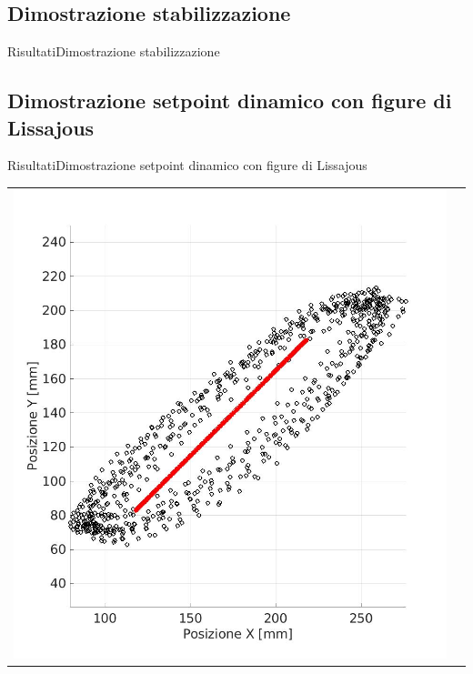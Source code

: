 \documentclass[10pt,aspectratio=169
	]{beamer}
\begin{document}
	\subsection{Dimostrazione stabilizzazione}
	\begin{frame}{Risultati}{Dimostrazione stabilizzazione}
	\centering{}

	\end{frame}
	
	\subsection{Dimostrazione setpoint dinamico con figure di Lissajous}
	\begin{frame}{Risultati}{Dimostrazione setpoint dinamico con figure di Lissajous}
	\centering
	\begin{tabular}{cc}
	\hspace{0cm}
  \includegraphics[height=0.4\textheight]{images/rc.jpg}
  &
  \hspace{1cm}

\end{tabular}
\end{frame}
\end{document}
